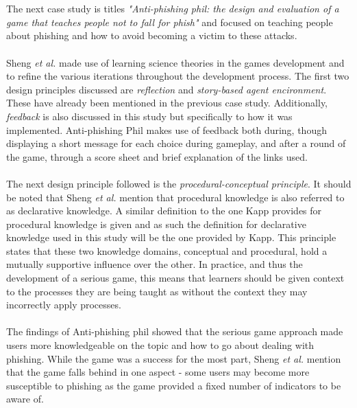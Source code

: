 \documentclass[conference]{IEEEtran}
\begin{document}
\\\\
The next case study is titles \textit{"Anti-phishing phil: the design and evaluation of a game that teaches people not to fall for phish"} and focused on teaching people about phishing and how to avoid becoming a victim to these attacks\cite{Sheng2007}. 
\\\\
Sheng \textit{et al.}\cite{Sheng2007} made use of learning science theories in the games development and to refine the various iterations throughout the development process. The first two design principles discussed are \textit{reflection} and \textit{story-based agent encironment}\cite{Sheng2007}. These have already been mentioned  in the previous case study. Additionally, \textit{feedback} is also discussed in this study but specifically to how it was implemented. Anti-phishing Phil makes use of feedback both during, though displaying a short message for each choice during gameplay, and after a round of the game, through a score sheet and brief explanation of the links used\cite{Sheng2007}. 
\\\\
The next design principle followed is the \textit{procedural-conceptual principle}\cite{Sheng2007}. It should be noted that Sheng \textit{et al.}\cite{Sheng2007} mention that procedural knowledge is also referred to as declarative knowledge. A similar definition to the one Kapp\cite{Kapp2012a} provides for procedural knowledge is given and as such the definition for declarative knowledge used in this study will be the one provided by Kapp\cite{Kapp2012a}. This principle states that these two knowledge domains, conceptual and procedural, hold a mutually supportive influence over the other\cite{Sheng2007}. In practice, and thus the development of a serious game, this means that learners should be given context to the processes they are being taught as without the context they may incorrectly apply processes\cite{Sheng2007}.
\\\\
The findings of Anti-phishing phil showed that the serious game approach made users more knowledgeable on the topic and how to go about dealing with phishing\cite{Sheng2007}. While the game was a success for the most part, Sheng \textit{et al.}\cite{Sheng2007} mention that the game falls behind in one aspect - some users may become more susceptible to phishing as the game provided a fixed number of indicators to be aware of.
\\\\
\end{document}
